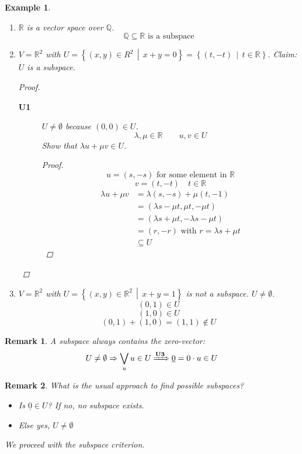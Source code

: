 \documentclass[a4paper,landscape,twocolumn]{article}
\newcommand\setdef[2]{\left\{#1\,\middle|\,#2\right\}}
\newtheorem{ex}{Example}
\newtheorem{rem}{Remark}
\begin{document}
\begin{ex}
  \begin{enumerate}
    \item $\mathbb R$ is a vector space over $\mathbb Q$.
      \[ \mathbb Q \subseteq \mathbb R \text{ is a subspace} \]
    \item $V = \mathbb R^2$ with $U = \setdef{(x, y) \in R^2}{x + y = 0} = \setdef{(t, -t)}{t \in \mathbb R}$.
      Claim: $U$ is a subspace.

      \begin{proof}
        \begin{description}
          \item[\textbf{U1}]
            $U \neq \emptyset$ because $(0, 0) \in U$.
            \[ \lambda, \mu \in \mathbb R \qquad u,v \in U \]
            Show that $\lambda u + \mu v \in U$.
            \begin{proof}
              \[ u = (s, -s) \text{ for some element in } \mathbb R \]
              \[ v = (t, -t) \quad t \in \mathbb R \]
              \begin{align*}
                \lambda u + \mu v &= \lambda (s, -s) + \mu (t, -1) \\
                  &= (\lambda s - \mu t, \mu t, -\mu t) \\
                  &= (\lambda s + \mu t, -\lambda s - \mu t) \\
                  &= (r, -r) \text{ with } r = \lambda s + \mu t \\
                  &\subseteq U
              \end{align*}
            \end{proof}
        \end{description}
      \end{proof}

    \item $V = \mathbb R^2$ with $U = \setdef{(x, y) \in \mathbb R^2}{x + y = 1}$
      is not a subspace. $U \neq \emptyset$.
      \[ (0, 1) \in U \]
      \[ (1, 0) \in U \]
      \[ (0, 1) + (1, 0) = (1, 1) \not\in U \]
  \end{enumerate}
\end{ex}

\begin{rem}
  A subspace always contains the zero-vector:
  \[ U \neq \emptyset \Rightarrow \bigvee_{u} u \in U \xRightarrow{\textbf{U3}} \underline{0} = 0 \cdot u \in U \]
\end{rem}

\begin{rem}
  What is the usual approach to find possible subspaces?
  \begin{itemize}
    \item Is $\underline{0} \in U$? If no, no subspace exists.
    \item Else yes, $U \neq \emptyset$
  \end{itemize}
  We proceed with the subspace criterion.
\end{rem}
\end{document}
